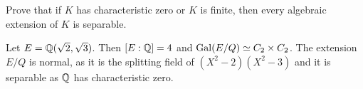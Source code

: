 \begin{exercise}
Prove that if $K$ has characteristic zero or $K$ is finite, then 
every algebraic extension of $K$ is separable. 
\end{exercise}


%



%
%
\begin{example}
    Let $E=\mathbb{Q}(\sqrt{2},\sqrt{3})$. Then 
    $[E:\mathbb{Q}]=4$ and 
    $\operatorname{Gal}(E/Q)\simeq C_2\times C_2$. The extension $E/Q$ is normal, 
    as it is the splitting field of $(X^2-2)(X^2-3)$ and 
    it is separable as $\mathbb{Q}$ has characteristic zero. 
\end{example}



